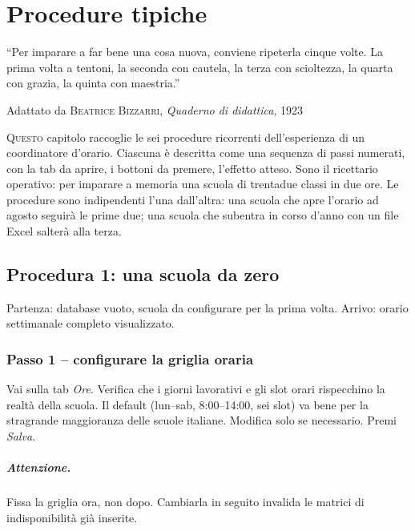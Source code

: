 \chapter{Procedure tipiche}
\label{ch:workflow_tipici}

\epigraph{``Per imparare a far bene una cosa nuova, conviene
ripeterla cinque volte. La prima volta a tentoni, la seconda
con cautela, la terza con scioltezza, la quarta con grazia,
la quinta con maestria.''}{Adattato da \textsc{Beatrice
Bizzarri}, \emph{Quaderno di didattica}, 1923}

\lettrine[lines=3]{Q}{uesto} capitolo raccoglie le sei procedure
ricorrenti dell'esperienza di un coordinatore d'orario. Ciascuna
\`e descritta come una sequenza di passi numerati, con la tab
da aprire, i bottoni da premere, l'effetto atteso. Sono il
ricettario operativo: per imparare a memoria una scuola di
trentadue classi in due ore. Le procedure sono indipendenti
l'una dall'altra: una scuola che apre l'orario ad agosto seguir\`a
le prime due; una scuola che subentra in corso d'anno con un
file Excel salter\`a alla terza.


\section{Procedura 1: una scuola da zero}
\label{sec:wf_da_zero}

Partenza: database vuoto, scuola da configurare per la prima
volta. Arrivo: orario settimanale completo visualizzato.

\subsection{Passo 1 -- configurare la griglia oraria}

Vai sulla tab \emph{Ore}. Verifica che i giorni lavorativi e
gli slot orari rispecchino la realt\`a della scuola. Il default
(lun--sab, 8:00--14:00, sei slot) va bene per la stragrande
maggioranza delle scuole italiane. Modifica solo se necessario.
Premi \emph{Salva}.

\paragraph{Attenzione.} Fissa la griglia ora, non dopo.
Cambiarla in seguito invalida le matrici di indisponibilit\`a
gi\`a inserite.

